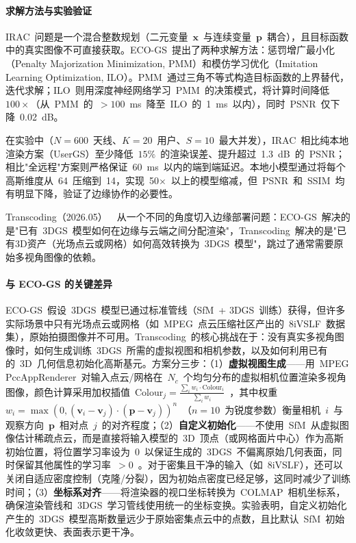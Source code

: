 \paragraph{求解方法与实验验证}

IRAC~问题是一个混合整数规划（二元变量~$\mathbf{x}$~与连续变量~$\mathbf{p}$~耦合），且目标函数中的真实图像不可直接获取。ECO-GS~提出了两种求解方法：惩罚增广最小化（Penalty Majorization Minimization, PMM）和模仿学习优化（Imitation Learning Optimization, ILO）。PMM~通过三角不等式构造目标函数的上界替代，迭代求解；ILO~则用深度神经网络学习~PMM~的决策模式，将计算时间降低~$100\times$（从~PMM~的~$>100$~ms~降至~ILO~的~1~ms~以内），同时~PSNR~仅下降~0.02~dB。

在实验中（$N=600$~天线、$K=20$~用户、$S=10$~最大并发），IRAC~相比纯本地渲染方案（UserGS）至少降低~$15\%$~的渲染误差、提升超过~1.3~dB~的~PSNR；相比"全远程"方案则严格保证~60~ms~以内的端到端延迟。本地小模型通过将每个高斯维度从~64~压缩到~14，实现~50$\times$~以上的模型缩减，但~PSNR~和~SSIM~均有明显下降，验证了边缘协作的必要性。

Transcoding（2026.05）~\cite{2605_21051}~从一个不同的角度切入边缘部署问题：ECO-GS~解决的是"已有~3DGS~模型如何在边缘与云端之间分配渲染"，Transcoding~解决的是"已有3D资产（光场点云或网格）如何高效转换为~3DGS~模型"，跳过了通常需要原始多视角图像的依赖。

\paragraph{与 ECO-GS 的关键差异}

ECO-GS~假设~3DGS~模型已通过标准管线（SfM~+ 3DGS~训练）获得，但许多实际场景中只有光场点云或网格（如~MPEG~点云压缩社区产出的~8iVSLF~数据集），原始拍摄图像并不可用。Transcoding~的核心挑战在于：没有真实多视角图像时，如何生成训练~3DGS~所需的虚拟视图和相机参数，以及如何利用已有的~3D~几何信息初始化高斯基元。方案分三步：（1）\textbf{虚拟视图生成}——用~MPEG PccAppRenderer~对输入点云/网格在~$N_c$~个均匀分布的虚拟相机位置渲染多视角图像，颜色计算采用加权插值~$\text{Colour}_j = \frac{\sum_i w_i \cdot \text{Colour}_i}{\sum_i w_i}$~，其中权重~$w_i = \max(0, (\mathbf{v}_i - \mathbf{v}_j) \cdot (\mathbf{p} - \mathbf{v}_j))^n$~（$n=10$~为锐度参数）衡量相机~$i$~与观察方向~$\mathbf{p}$~相对点~$j$~的对齐程度；（2）\textbf{自定义初始化}——不使用~SfM~从虚拟图像估计稀疏点云，而是直接将输入模型的~3D~顶点（或网格面片中心）作为高斯初始位置，将位置学习率设为~0~以保证生成的~3DGS~不偏离原始几何表面，同时保留其他属性的学习率~$>0$~。对于密集且干净的输入（如~8iVSLF），还可以关闭自适应密度控制（克隆/分裂），因为初始点密度已经足够，这同时减少了训练时间；（3）\textbf{坐标系对齐}——将渲染器的视口坐标转换为~COLMAP~相机坐标系，确保渲染管线和~3DGS~学习管线使用统一的坐标变换。实验表明，自定义初始化产生的~3DGS~模型高斯数量远少于原始密集点云中的点数，且比默认~SfM~初始化收敛更快、表面表示更干净。

